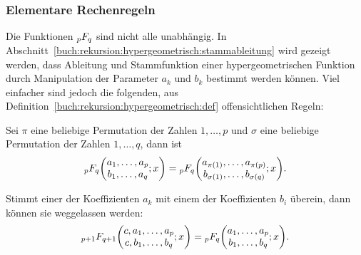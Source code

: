 %
%
\subsubsection{Elementare Rechenregeln}
Die Funktionen $\mathstrut_pF_q$ sind nicht alle unabhängig.
In Abschnitt~\ref{buch:rekursion:hypergeometrisch:stammableitung}
wird gezeigt werden, dass Ableitung und Stammfunktion einer hypergeometrischen
Funktion durch Manipulation der Parameter $a_k$ und $b_k$ bestimmt werden
können.
Viel einfacher sind jedoch die folgenden, aus
Definition~\ref{buch:rekursion:hypergeometrisch:def}
offensichtlichen Regeln:

\begin{satz}[Permutationsregel]
%
%
\label{buch:rekursion:hypergeometrisch:satz:permuationsregel}
Sei $\pi$ eine beliebige Permutation der Zahlen $1,\dots,p$ und $\sigma$ eine
beliebige Permutation der Zahlen $1,\dots,q$, dann ist 
\begin{equation}
\mathstrut_pF_q\biggl(
\begin{matrix}
a_1,\dots,a_p\\b_1,\dots,a_q
\end{matrix}
;x
\biggr)
=
\mathstrut_pF_q\biggl(
\begin{matrix}
a_{\pi(1)},\dots,a_{\pi(p)}\\b_{\sigma(1)},\dots,b_{\sigma(q)}
\end{matrix}
;x
\biggr).
\label{buch:rekursion:hypergeometrisch:eqn:permuationsregel}
\end{equation}
\end{satz}

\begin{satz}[Kürzungsformel]
%
%
\label{buch:rekursion:hypergeometrisch:satz:kuerzungsregel}
Stimmt einer der Koeffizienten $a_k$ mit einem der Koeffizienten $b_i$
überein, dann können sie weggelassen werden:
\begin{equation}
\mathstrut_{p+1}F_{q+1}\biggl(
\begin{matrix}
c,a_1,\dots,a_p\\
c,b_1,\dots,b_q
\end{matrix};
x
\biggr)
=
\mathstrut_{p}F_{q}\biggl(
\begin{matrix}
a_1,\dots,a_p\\
b_1,\dots,b_q
\end{matrix};
x
\biggr).
\label{buch:rekursion:hypergeometrisch:eqn:kuerzungsregel}
\end{equation}
\end{satz}

